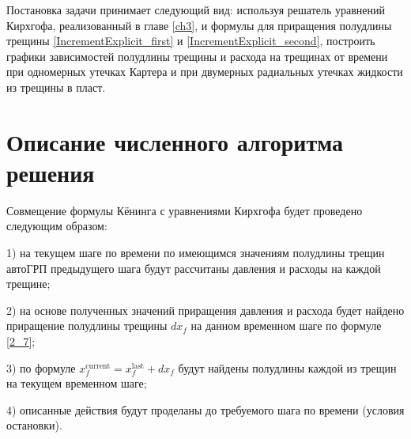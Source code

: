 Постановка задачи принимает следующий вид: используя решатель уравнений Кирхгофа, реализованный в главе \ref{ch3}, и формулы для приращения полудлины трещины \eqref{IncrementExplicit_first} и \eqref{IncrementExplicit_second}, построить графики зависимостей полудлины трещины и расхода на трещинах от времени при одномерных утечках Картера и при двумерных радиальных утечках жидкости из трещины в пласт.

\section{Описание численного алгоритма решения}

Совмещение формулы Кёнинга с уравнениями Кирхгофа будет проведено следующим образом:

1) на текущем шаге по времени по имеющимся значениям полудлины трещин автоГРП предыдущего шага будут рассчитаны давления и расходы на каждой трещине;

2) на основе полученных значений приращения давления и расхода будет найдено приращение полудлины трещины $dx_{\!f}$ на данном временном шаге по формуле \eqref{2_7};

3) по формуле $x_{\!f}^{\text{current}}=x_{\!f}^{\text{last}}+dx_{\!f}$ будут найдены полудлины каждой из трещин на текущем временном шаге;

4) описанные действия будут проделаны до требуемого шага по времени (условия остановки).

%

